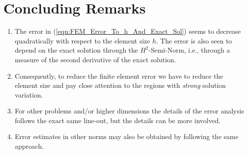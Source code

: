 \section{Concluding Remarks}
\begin{enumerate}
	\item The error in (\ref{eqn:FEM_Error_To_h_And_Exact_Sol}) seems to decrease quadratically with respect to the element size $h$.
	The error is also seen to depend on the exact solution through the $H^2$-Semi-Norm, i.e., through a measure of the second
	derivative of the exact solution.
	
	\item Consequently, to reduce the finite element error we have to reduce the element size and pay close attention to the regions with
	\emph{strong} solution variation.
	
	\item For other problems and/or higher dimensions the details of the error analysis follows the exact same line-out, but the
	details can be more involved.

	\item Error estimates in other norms may also be obtained by following the same approach.
\end{enumerate}
%